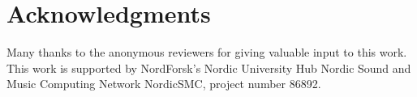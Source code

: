 \documentclass[twoside,a4paper,dvipsnames]{article}
\begin{document}
\section{Acknowledgments}
Many thanks to the anonymous reviewers for giving valuable input to this work. This work is supported by NordForsk's Nordic
University Hub Nordic Sound and Music Computing Network
NordicSMC, project number 86892.

\nocite{*}
\begin{footnotesize}

 
\end{footnotesize}

\end{document}
